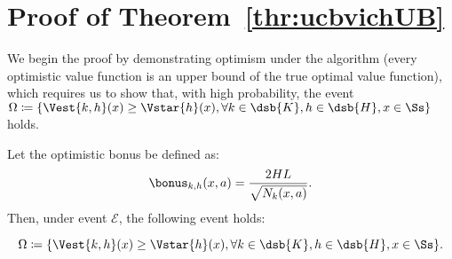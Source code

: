 \section{Proof of Theorem~\ref{thr:ucbvichUB}}
\label{apx:proof_CH}

\ucbvichUB*

We begin the proof by demonstrating optimism under the \ucbvich algorithm (\ie every optimistic value function is an upper bound of the true optimal value function), which requires us to show that, with high probability, the event $\Omega \coloneqq \{ \Vest{k,h}(x) \ge \Vstar{h}(x), \forall k \in \dsb{K}, h \in \dsb{H}, x \in \Ss \}$ holds.

\begin{lemma}
\label{lem:CH_opt}
    Let the optimistic bonus be defined as:
    \begin{equation*}
        \bonus_{k,h}(x,a) = \frac{2HL}{\sqrt{N_k(x,a)}}.
    \end{equation*}
    Then, under event $\mathcal{E}$, the following event holds:

    \begin{equation*}
        \Omega \coloneqq \{ \Vest{k,h}(x) \ge \Vstar{h}(x), \forall k \in \dsb{K}, h \in \dsb{H}, x \in \Ss \}.
    \end{equation*}
\end{lemma}

